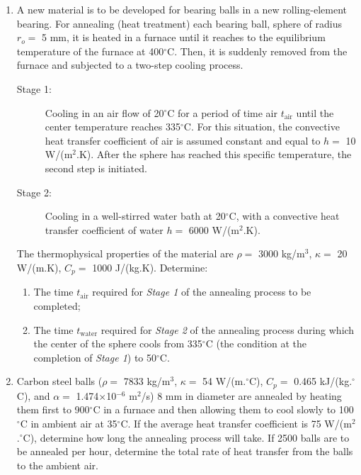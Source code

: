 \documentclass[12pts,a4paper,amsmath,amssymb,floatfix]{article}%
\begin{document}
\begin{enumerate}[label=\bfseries Problem \arabic*:]
\item\label{Problem:Analytical_Prob1} A new material is to be developed for bearing balls in a new rolling-element bearing. For annealing (heat treatment) each bearing ball, sphere of radius $r_{o} =$ 5 mm, it is heated in a furnace until it reaches to the equilibrium temperature of the furnace at 400$^{\circ}$C. Then, it is suddenly removed from the furnace and subjected to a two-step cooling process.
   \begin{description}
      \item[Stage 1:] Cooling in an air flow of 20$^{\circ}$C for a period of time air $t_{\text{air}}$ until the center temperature reaches 335$^{\circ}$C. For this situation, the convective heat transfer coefficient of air is assumed constant and equal to $h =$ 10 W/(m$^{2}$.K). After the sphere has reached this specific temperature, the second step is initiated. 
      \item[Stage 2:] Cooling in a well-stirred water bath at 20$^{\circ}$C, with a convective heat transfer coefficient of water $h =$ 6000 W/(m$^{2}$.K). 
   \end{description}
   The thermophysical properties of the material are $\rho =$ 3000 kg/m$^{3}$, $\kappa =$ 20 W/(m.K), $C_{p} =$ 1000 J/(kg.K). Determine:
   \begin{enumerate}%
      \item The time $t_{\text{air}}$ required for {\it Stage 1} of the annealing process to be completed;
      \item The time $t_{\text{water}}$ required for {\it Stage 2} of the annealing process during which the center of the sphere cools from 335$^{\circ}$C (the condition at the completion of {\it Stage 1}) to 50$^{\circ}$C. 
   \end{enumerate}

\item\label{Problem:Lumped_Prob2} Carbon steel balls ($\rho=$ 7833 kg/m$^{3}$, $\kappa=$ 54 W/(m.$^{\circ}$C), $C_{p}=$ 0.465 kJ/(kg.$^{\circ}$C), and $\alpha=$ 1.474$\times$10$^{-6}$ m$^{2}$/s) 8 mm in diameter are annealed by heating them first to 900$^{\circ}$C in a furnace and then allowing them to cool slowly to 100$^{\circ}$C in ambient air at 35$^{\circ}$C. If the average heat transfer coefficient is 75 W/(m$^{2}$.$^{\circ}$C), determine how long the annealing process will take. If 2500 balls are to be annealed per hour, determine the total rate of heat transfer from the balls to the ambient air.


\end{enumerate}
\end{document}

